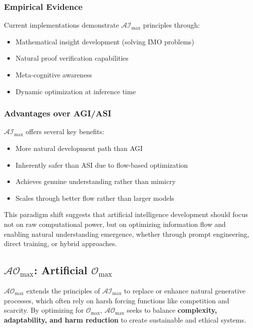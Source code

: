 \documentclass[12pt]{article}
\begin{document}
\subsubsection{Empirical Evidence}
Current implementations demonstrate \( \mathcal{AI}_{\text{max}} \) principles through:
\begin{itemize}
    \item Mathematical insight development (solving IMO problems)
    \item Natural proof verification capabilities
    \item Meta-cognitive awareness
    \item Dynamic optimization at inference time
\end{itemize}

\subsubsection{Advantages over AGI/ASI}
\( \mathcal{AI}_{\text{max}} \) offers several key benefits:
\begin{itemize}
    \item More natural development path than AGI
    \item Inherently safer than ASI due to flow-based optimization
    \item Achieves genuine understanding rather than mimicry
    \item Scales through better flow rather than larger models
\end{itemize}

This paradigm shift suggests that artificial intelligence development should focus not on raw computational power, but on optimizing information flow and enabling natural understanding emergence, whether through prompt engineering, direct training, or hybrid approaches.

\subsection{\( \mathcal{AO}_{\text{max}} \): Artificial \( \mathcal{O}_{\text{max}} \)}

\( \mathcal{AO}_{\text{max}} \) extends the principles of \( \mathcal{AI}_{\text{max}} \) to replace or enhance natural generative processes, which often rely on harsh forcing functions like competition and scarcity. By optimizing for \( \mathcal{O}_{\text{max}} \), \( \mathcal{AO}_{\text{max}} \) seeks to balance \textbf{complexity, adaptability, and harm reduction} to create sustainable and ethical systems.
\end{document}
